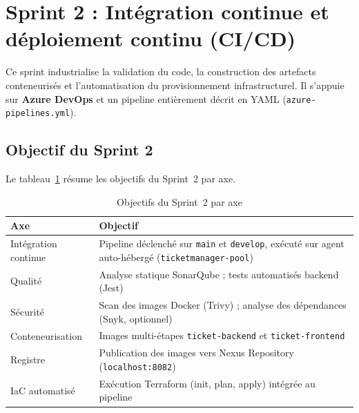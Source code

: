 
\section[Sprint 2 : Intégration continue et déploiement continu (CI/CD)]%
{Sprint 2 : Intégration continue et déploiement continu (CI/CD)}

Ce sprint industrialise la validation du code, la construction des artefacts conteneurisés
et l'automatisation du provisionnement infrastructurel. Il s'appuie sur \textbf{Azure DevOps}
et un pipeline entièrement décrit en YAML (\texttt{azure-pipelines.yml}).


\subsection{Objectif du Sprint 2}

Le tableau~\ref{tab:r2-s2-objectifs} résume les objectifs du Sprint~2 par axe.

\begin{table}[H]
\centering
\caption{Objectifs du Sprint~2 par axe}
\label{tab:r2-s2-objectifs}
\footnotesize
\renewcommand{\arraystretch}{1.1}
\setlength{\tabcolsep}{6pt}
\begin{tabular}{|p{2.8cm}|p{9.2cm}|}
\hline
\textbf{Axe} & \textbf{Objectif} \\
\hline
Intégration continue &
  Pipeline déclenché sur \texttt{main} et \texttt{develop}, exécuté sur agent
  auto-hébergé (\texttt{ticketmanager-pool}) \\
\hline
Qualité &
  Analyse statique SonarQube ; tests automatisés backend (Jest) \\
\hline
Sécurité &
  Scan des images Docker (Trivy) ; analyse des dépendances (Snyk, optionnel) \\
\hline
Conteneurisation &
  Images multi-étapes \texttt{ticket-backend} et \texttt{ticket-frontend} \\
\hline
Registre &
  Publication des images vers Nexus Repository (\texttt{localhost:8082}) \\
\hline
IaC automatisé &
  Exécution Terraform (init, plan, apply) intégrée au pipeline \\
\hline
\end{tabular}
\end{table}


